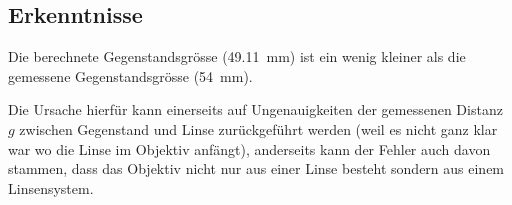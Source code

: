 \subsection{Erkenntnisse}

Die  berechnete Gegenstandsgr\"osse (\SI{49.11}{\milli\meter}) ist  ein  wenig
kleiner   als   die   gemessene  Gegenstandsgr\"osse  (\SI{54}{\milli\meter}).

Die  Ursache hierf\"ur kann  einerseits  auf  Ungenauigkeiten  der  gemessenen
Distanz $g$  zwischen  Gegenstand  und Linse zur\"uckgef\"uhrt werden (weil es
nicht ganz klar war wo die Linse im Objektiv anf\"angt), anderseits  kann  der
Fehler auch davon stammen, dass das Objektiv nicht nur aus einer Linse besteht
sondern aus einem Linsensystem.

